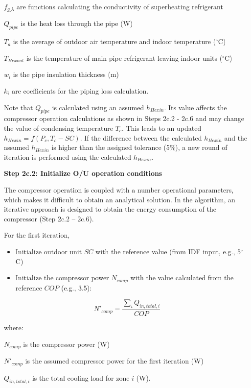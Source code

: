 $f_{g\_\lambda}$ are functions calculating the conductivity of superheating refrigerant 

$Q_{pipe}$ is the heat loss through the pipe (W)

$T_a$ is the average of outdoor air temperature and indoor temperature (\(^{\circ}\)C)

$T_{Hexout}$ is the temperature of main pipe refrigerant leaving indoor units (\(^{\circ}\)C) 

$w_i$ is the pipe insulation thickness (m) 

$k_i$ are coefficients for the piping loss calculation.

Note that $Q_{pipe}$ is calculated using an assumed $h_{Hexin}$. Its value affects the compressor operation calculations as shown in Steps 2c.2 - 2c.6 and may change the value of condensing temperature $T_c$. This leads to an updated $h_{Hexin}=f(P_c,T_c-SC)$. If the difference between the calculated $h_{Hexin}$ and the assumed $h_{Hexin}$ is higher than the assigned tolerance (5\%), a new round of iteration is performed using the calculated $h_{Hexin}$.

\textbf{Step 2c.2: Initialize O/U operation conditions} 

The compressor operation is coupled with a number operational parameters, which makes it difficult to obtain an analytical solution. In the algorithm, an iterative approach is designed to obtain the energy consumption of the compressor (Step 2c.2 – 2c.6).

For the first iteration, 

\begin{itemize}
  \item
    Initialize outdoor unit $SC$ with the reference value (from IDF input, e.g., 5\(^{\circ}\)C)
  \item
    Initialize the compressor power $N_{comp}$ with the value calculated from the reference $COP$ (e.g., 3.5):
\end{itemize}

\begin{equation}N'_{comp}=\frac{\sum_iQ_{in,total,i}}{COP}\end{equation}

where:

$N_{comp}$ is the compressor power (W)

$N'_{comp}$ is the assumed compressor power for the first iteration (W)

$Q_{in,total,i}$ is the total cooling load for zone $i$ (W).

